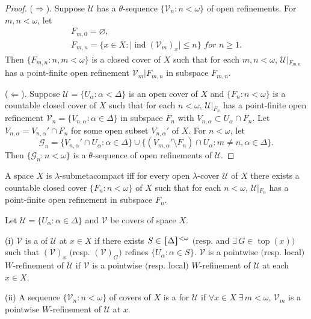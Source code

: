\documentclass[main.tex]{subfiles}
\begin{document}
\begin{proof}
($\Rightarrow$). Suppose $\mathscr{U}$ has a $\theta$-sequence 
$\{\mathscr{V}_n: n < \omega\}$ of open refinements. For $m, n < \omega$, let 
\begin{gather*}
	F_{m, 0} = \varnothing, \\
	F_{m,n} = \{x \in X: \vert{}\operatorname{ind}(\mathscr{V}_m)_x\vert{} \le n\} \textit{ for } n\ge 1.
\end{gather*}
Then $\{F_{m,n}: n, m < \omega\}$ is a closed cover of $X$ such that for each $m, n < \omega$, 
$\mathscr{U} \vert{}_{F_{m,n}}$ has a point-finite open refinement 
$\mathscr{V}_m \vert{} F_{m,n}$ in subspace $F_{m,n}$.

($\Leftarrow$). Suppose $\mathscr{U} = \{U_\alpha: \alpha < \Delta\}$ is an 
open cover of $X$ and $\{F_n: n < \omega\}$ is a countable closed cover of $X$ 
such that for each $n < \omega$, $\mathscr{U} \vert{}_{F_n}$ has a point-finite 
open refinement $\mathscr{V}_n = \{V_{n,\alpha}: \alpha \in \Delta\}$ in subspace 
$F_n$ with $V_{n,\alpha} \subset U_\alpha\cap F_n$. 
Let $V_{n,\alpha} = V_{n,\alpha}' \cap F_n$ for some open subset $V_{n,\alpha}'$ of $X$. 
For $n < \omega$, let
$$\mathscr{G}_n = \{V_{n,\alpha}'\cap U_\alpha: \alpha \in \Delta\} \cup 
\{(V_{m,\alpha}'\setminus F_n)\cap U_\alpha: m\ne n, \alpha\in\Delta\}.$$
Then $\{\mathscr{G}_n: n < \omega\}$ is a $\theta$-sequence of open refinements 
of $\mathscr{U}$.
\end{proof}

{\theorem{} \label{th:3.1.5}
A space $X$ is $\lambda$-submetacompact iff for every open $\lambda$-cover
 $\mathscr{U}$ of $X$ there exists a countable closed cover $\{F_n: n < \omega\}$ of $X$ 
 such that for each $n < \omega$, $\mathscr{U} \vert{}_{ F_n}$ has a point-finite 
 open refinement in subspace $F_n$.\hfill\qedsymbol
}

{ \label{def:3.1.6}
Let $\mathscr{U} = \{ U_\alpha: \alpha \in\Delta \}$ and $\mathscr{V}$ be covers of space $X$.

\textup{(i)} $\mathscr{V}$ is a 
of $\mathscr{U}$ at $x \in X$ if there exists $S \in \hstretch{1.8}{[}\Delta\hstretch{1.8}{]}^{<\omega}$ 
$($resp. and $\exists \, G\in \operatorname{top}(x) )$ such that $(\mathscr{V})_x$ 
$($resp.  $(\mathscr{V})_G )$ refines $\{U_\alpha: \alpha \in S\}$.
 $\mathscr{V}$ is a pointwise $($resp. local$)$ $W$-refinement of $\mathscr{U}$  if $\mathscr{V}$ is a pointwise $($resp. local$)$ $W$-refinement of $\mathscr{U}$ at each $x \in X$.

\textup{(ii)} A sequence $\{\mathscr{V}_n: n< \omega\}$ of covers of $X$ is a 
for $\mathscr{U}$ if $\forall x \in X \; \exists \, m < \omega$, $\mathscr{V}_m$ is 
a pointwise $W$-refinement of $\mathscr{U}$ at $x$.
}
\end{document}
